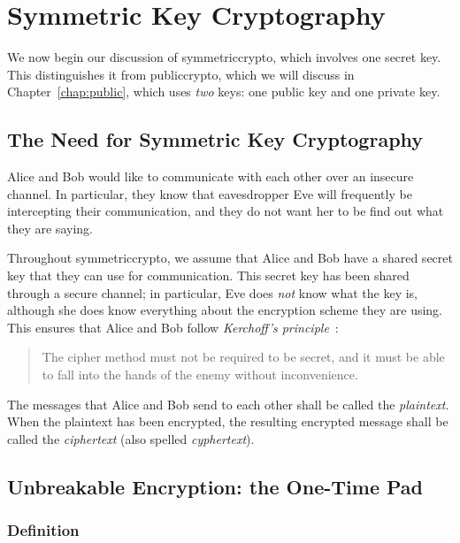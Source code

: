 \chapter{Symmetric Key Cryptography}
\label{chap:symmetric}

We now begin our discussion of \gls{symmetriccrypto},
which involves one secret key.
This distinguishes it from \gls{publiccrypto}, which we will
discuss in Chapter~\ref{chap:public}, which uses \emph{two} keys:
one public key and one private key.



\section{The Need for Symmetric Key Cryptography}

Alice and Bob would like to communicate with each other
over an \gls{insecure channel}.
In particular, they know that eavesdropper Eve will frequently
be intercepting their communication,
and they do not want her to be find out what they are saying.

Throughout \gls{symmetriccrypto}, we assume that Alice and Bob
have a shared secret key that they can use for communication.
This secret key has been shared through a \gls{secure channel};
in particular, Eve does \emph{not} know what the key is,
although she does know everything about the \gls{encryption scheme}
they are using.
This ensures that Alice and Bob follow
\emph{Kerchoff's principle}~\cite[Page 5]{IntroModernCrypto}:

\begin{quote}
    The cipher method must not be required to be secret,
    and it must be able to fall into the hands of the enemy
    without inconvenience.
\end{quote}

\noindent
The messages that Alice and Bob send to each other shall be called
the \emph{plaintext}.
When the plaintext has been encrypted, the resulting encrypted message
shall be called the \emph{ciphertext} (also spelled \emph{cyphertext}).



\section{Unbreakable Encryption: the One-Time Pad}

\subsection{Definition}

